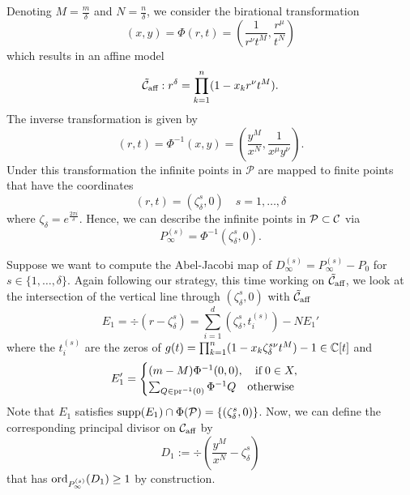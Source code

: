 \documentclass[main.tex]{subfiles}
\begin{document}
  Denoting $M = \frac{m}\delta$ and $N = \frac{n}\delta$, we consider the birational transformation
  \begin{equation}
   (x,y) = \Phi(r,t) = \left(\frac{1}{r^{\nu}t^M},\frac{r^{\mu}}{t^N}\right)
  \end{equation}
  which results in an affine model
  \begin{equation}
   \tilde{\mathcal{C}}_{\text{aff}} : r^{\delta} = \prod_{k=1}^n (1-x_kr^{\nu}t^M).
  \end{equation}
  The inverse transformation is given by
  \begin{equation}
   (r,t) = \Phi^{-1}(x,y) = \left(\frac{y^M}{x^N},\frac{1}{x^{\mu}y^{\nu}}\right).
  \end{equation}
  Under this transformation the infinite points in $\mathcal{P}$ are mapped to finite points that have the coordinates
  \begin{equation}
   (r,t) = (\zeta_{\delta}^s,0) \quad s= 1,\dots,\delta
  \end{equation}
  where $\zeta_{\delta} = e^{\frac{2\pi i }{\delta}}$. 
  Hence, we can describe the infinite points in $\mathcal{P} \subset \mathcal{C}$ via
   \begin{equation}
      P_{\infty}^{(s)} = \Phi^{-1}(\zeta_{\delta}^s,0).
   \end{equation}
   
   
   Suppose we want to compute the Abel-Jacobi map of $D_{\infty}^{(s)} = P_{\infty}^{(s)} - P_0$ for $s \in \{1,\dots,\delta\}$.
   Again following our strategy,
   this time working on $\tilde{\mathcal{C}}_{\text{aff}}$, we look at the intersection of the vertical line through $(\zeta_{\delta}^s,0)$ with
   $\tilde{\mathcal{C}}_{\text{aff}}$
   \begin{equation}
      E_1 = \div(r - \zeta_{\delta}^s) = \sum_{i = 1}^{d} \left(\zeta_{\delta}^s,t_i^{(s)}\right) - N E_1'
   \end{equation}
      where the $t_i^{(s)}$ are the zeros of $g(t) = \prod_{k=1}^n (1-x_k\zeta_{\delta}^{s\nu}t^M) - 1 \in \mathbb{C}[t]$ and
    \begin{equation}\label{eq:zero_bp1}
       E_1' = \begin{cases}
	     (m-M) \Phi^{-1}(0,0), \quad \text{if} \; 0 \in X, \\
             \sum_{Q \in \operatorname{pr}^{-1}(0)} \Phi^{-1}Q \quad \text{otherwise}
            \end{cases}
    \end{equation}
    Note that $E_1$ satisfies $\operatorname{supp}(E_1) \cap \Phi(\mathcal{P}) = \{ (\zeta_{\delta}^s,0) \}$.
    Now, we can define the corresponding principal divisor on $\mathcal{C}_{\text{aff}}$ by
    \begin{equation}
       D_1 := \div \left( \frac{y^M}{x^N} - \zeta_{\delta}^s \right)
    \end{equation}
   that has $\operatorname{ord}_{P_{\infty}^{(s)}}(D_1) \ge 1$ by construction.
    
\end{document}
